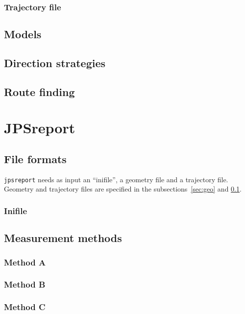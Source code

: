 \documentclass[%
paper=A4,					%
twoside=true,				%
openright,					%
parskip=full,				%
chapterprefix=true,			%
11pt,						%
headings=normal,			%
bibliography=totoc,			%
listof=totoc,				%
titlepage=on,				%
captions=tableabove,		%
draft=false,				%
]{scrreprt}%
\begin{document}
\subsection{Trajectory file}
\label{sec:traj}


\section{Models}

\newpage
\section{Direction strategies}

\newpage
\section{Route finding}

\chapter{JPSreport}
\section{File formats}
\texttt{jpsreport} needs as input an ``inifile'', a geometry file and a trajectory file.
Geometry and trajectory files are specified in the subsections~\ref{sec:geo} and \ref{sec:traj}. 
\subsection{Inifile}

\newpage
\section{Measurement methods}
\subsection{Method A}

\newpage
\subsection{Method B}

\newpage
\subsection{Method C}

\newpage
\end{document}
